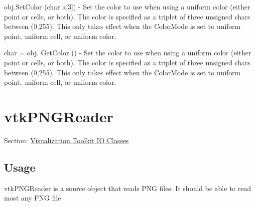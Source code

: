 \begin{DoxyItemize}
\item {\ttfamily obj.\-Set\-Color (char a\mbox{[}3\mbox{]})} -\/ Set the color to use when using a uniform color (either point or cells, or both). The color is specified as a triplet of three unsigned chars between (0,255). This only takes effect when the Color\-Mode is set to uniform point, uniform cell, or uniform color.  
\item {\ttfamily char = obj. Get\-Color ()} -\/ Set the color to use when using a uniform color (either point or cells, or both). The color is specified as a triplet of three unsigned chars between (0,255). This only takes effect when the Color\-Mode is set to uniform point, uniform cell, or uniform color.  
\end{DoxyItemize}\hypertarget{vtkio_vtkpngreader}{}\section{vtk\-P\-N\-G\-Reader}\label{vtkio_vtkpngreader}
Section\-: \hyperlink{sec_vtkio}{Visualization Toolkit I\-O Classes} \hypertarget{vtkwidgets_vtkxyplotwidget_Usage}{}\subsection{Usage}\label{vtkwidgets_vtkxyplotwidget_Usage}
vtk\-P\-N\-G\-Reader is a source object that reads P\-N\-G files. It should be able to read most any P\-N\-G file

